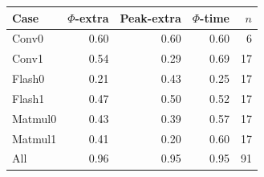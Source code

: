 \begin{tabular}{lrrrr}
\toprule
Case & $\Phi$-extra & Peak-extra & $\Phi$-time & $n$ \\
\midrule
Conv0 & 0.60 & 0.60 & 0.60 & 6 \\
Conv1 & 0.54 & 0.29 & 0.69 & 17 \\
Flash0 & 0.21 & 0.43 & 0.25 & 17 \\
Flash1 & 0.47 & 0.50 & 0.52 & 17 \\
Matmul0 & 0.43 & 0.39 & 0.57 & 17 \\
Matmul1 & 0.41 & 0.20 & 0.60 & 17 \\
All & 0.96 & 0.95 & 0.95 & 91 \\
\bottomrule
\end{tabular}
